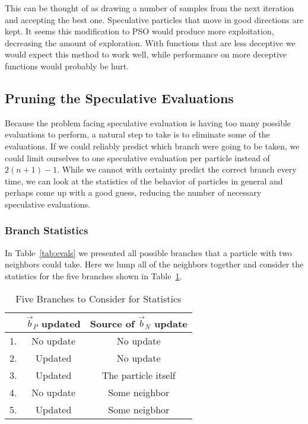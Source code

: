 \documentclass[journal,letterpaper]{IEEEtran}
\providecommand{\nbest}{\ensuremath{\Vec{b}_N}}
\providecommand{\pbest}{\ensuremath{\Vec{b}_P}}
\begin{document}
This can be thought of as drawing a number of samples from the next iteration
and accepting the best one.  Speculative particles that move in good directions
are kept.  It seems this modification to PSO would produce more exploitation,
decreasing the amount of exploration.  With functions that are less deceptive
we would expect this method to work well, while performance on more deceptive
functions would probably be hurt.

\subsection{Pruning the Speculative Evaluations}

Because the problem facing speculative evaluation is having too many possible
evaluations to perform, a natural step to take is to eliminate some of the
evaluations.  If we could reliably predict which branch were going to be taken,
we could limit ourselves to one speculative evaluation per particle instead of
$2(n+1)-1$.  While we cannot with certainty predict the correct branch every
time, we can look at the statistics of the behavior of particles in general and
perhaps come up with a good guess, reducing the number of necessary speculative
evaluations.

\subsubsection{Branch Statistics}

In Table~\ref{tab:evals} we presented all possible branches that a particle
with two neighbors could take.  Here we lump all of the neighbors together and
consider the statistics for the five branches shown in Table~\ref{tab:branches}.

\begin{table}
  \caption{Five Branches to Consider for Statistics}
  \label{tab:branches}
  \centering
  \begin{tabular}{rc|c}
	&$\pbest$ updated&Source of $\nbest$ update\\
	\hline
	1.&No update&No update\\
	2.&Updated&No update\\
	3.&Updated&The particle itself\\
	4.&No update&Some neighbor\\
	5.&Updated&Some neigbhor\\
  \end{tabular}
\end{table}
\end{document}
